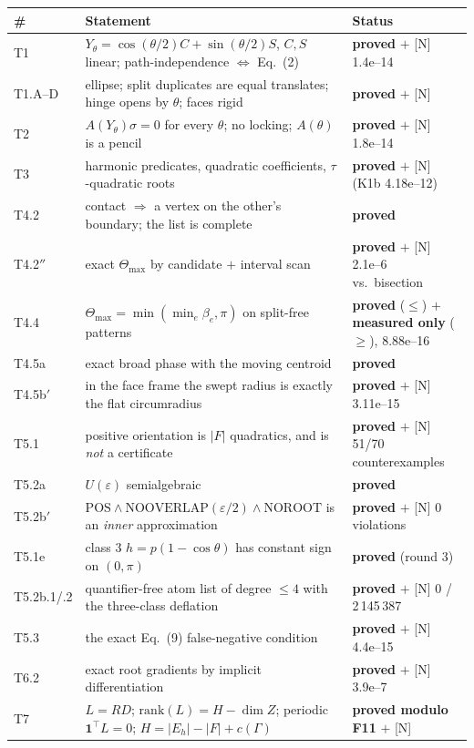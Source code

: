 \documentclass[10pt,a4paper]{article}
\begin{document}
\begin{table}[h]\centering\small
\begin{tabular}{@{}p{14mm}p{92mm}p{48mm}@{}}
\toprule
\# & Statement & Status \\
\midrule
T1 & $Y_\theta = \cos(\theta/2)C+\sin(\theta/2)S$, $C,S$ linear; path-independence $\Leftrightarrow$ Eq.~(2) & \textbf{proved} $+$ [N] 1.4e--14 \\
T1.A--D & ellipse; split duplicates are equal translates; hinge opens by $\theta$; faces rigid & \textbf{proved} $+$ [N] \\
T2 & $A(Y_\theta)\sigma = 0$ for every $\theta$; no locking; $A(\theta)$ is a pencil & \textbf{proved} $+$ [N] 1.8e--14 \\
T3 & harmonic predicates, quadratic coefficients, $\tau$-quadratic roots & \textbf{proved} $+$ [N] (K1b 4.18e--12) \\
T4.2 & contact $\Rightarrow$ a vertex on the other's boundary; the list is complete & \textbf{proved} \\
T4.2$''$ & exact $\Theta_{\max}$ by candidate $+$ interval scan & \textbf{proved} $+$ [N] 2.1e--6 vs.\ bisection \\
T4.4 & $\Theta_{\max} = \min(\min_e\beta_e,\pi)$ on split-free patterns & \textbf{proved} ($\le$) $+$ \textbf{measured only} ($\ge$), 8.88e--16 \\
T4.5a & exact broad phase with the moving centroid & \textbf{proved} \\
T4.5b$'$ & in the face frame the swept radius is exactly the flat circumradius & \textbf{proved} $+$ [N] 3.11e--15 \\
T5.1 & positive orientation is $|F|$ quadratics, and is \emph{not} a certificate & \textbf{proved} $+$ [N] 51/70 counterexamples \\
T5.2a & $U(\varepsilon)$ semialgebraic & \textbf{proved} \\
T5.2b$'$ & $\mathrm{POS}\wedge\mathrm{NOOVERLAP}(\varepsilon/2)\wedge\mathrm{NOROOT}$ is an \emph{inner} approximation & \textbf{proved} $+$ [N] 0 violations \\
T5.1e & class 3 $h = p(1-\cos\theta)$ has constant sign on $(0,\pi)$ & \textbf{proved} (round 3) \\
T5.2b.1/.2 & quantifier-free atom list of degree $\le 4$ with the three-class deflation & \textbf{proved} $+$ [N] 0 / 2\,145\,387 \\
T5.3 & the exact Eq.~(9) false-negative condition & \textbf{proved} $+$ [N] 4.4e--15 \\
T6.2 & exact root gradients by implicit differentiation & \textbf{proved} $+$ [N] 3.9e--7 \\
T7 & $L=RD$; $\mathrm{rank}(L) = H-\dim Z$; periodic $\mathbf 1^{\!\top}L=0$; $H = |E_h|-|F|+c(\Gamma)$ & \textbf{proved modulo F11} $+$ [N] \\
\bottomrule
\end{tabular}
\end{table}
\end{document}
